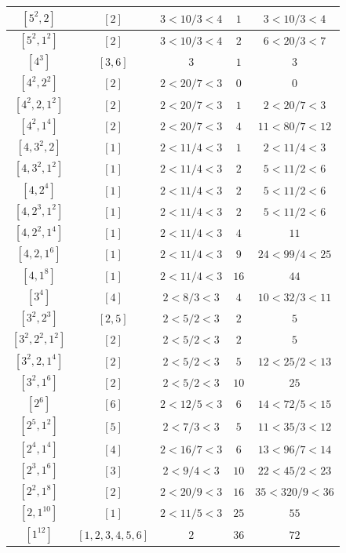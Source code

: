 \documentclass{article}%
\begin{document}
\begin{center}
\begin{longtable}{||c|c|c|c|c||}
$[5^{2}, 2]$ & $[2]$ & $3 < 10/3 < 4$ & $1$ & $3 < 10/3 < 4$ \\ \hline 
$[5^{2}, 1^{2}]$ & $[2]$ & $3 < 10/3 < 4$ & $2$ & $6 < 20/3 < 7$ \\ \hline 
$[4^{3}]$ & $[3, 6]$ & $3$ & $1$ & $3$ \\ \hline 
$[4^{2}, 2^{2}]$ & $[2]$ & $2 < 20/7 < 3$ & $0$ & $0$ \\ \hline 
$[4^{2}, 2, 1^{2}]$ & $[2]$ & $2 < 20/7 < 3$ & $1$ & $2 < 20/7 < 3$ \\ \hline 
$[4^{2}, 1^{4}]$ & $[2]$ & $2 < 20/7 < 3$ & $4$ & $11 < 80/7 < 12$ \\ \hline 
$[4, 3^{2}, 2]$ & $[1]$ & $2 < 11/4 < 3$ & $1$ & $2 < 11/4 < 3$ \\ \hline 
$[4, 3^{2}, 1^{2}]$ & $[1]$ & $2 < 11/4 < 3$ & $2$ & $5 < 11/2 < 6$ \\ \hline 
$[4, 2^{4}]$ & $[1]$ & $2 < 11/4 < 3$ & $2$ & $5 < 11/2 < 6$ \\ \hline 
$[4, 2^{3}, 1^{2}]$ & $[1]$ & $2 < 11/4 < 3$ & $2$ & $5 < 11/2 < 6$ \\ \hline 
$[4, 2^{2}, 1^{4}]$ & $[1]$ & $2 < 11/4 < 3$ & $4$ & $11$ \\ \hline 
$[4, 2, 1^{6}]$ & $[1]$ & $2 < 11/4 < 3$ & $9$ & $24 < 99/4 < 25$ \\ \hline 
$[4, 1^{8}]$ & $[1]$ & $2 < 11/4 < 3$ & $16$ & $44$ \\ \hline 
$[3^{4}]$ & $[4]$ & $2 < 8/3 < 3$ & $4$ & $10 < 32/3 < 11$ \\ \hline 
$[3^{2}, 2^{3}]$ & $[2, 5]$ & $2 < 5/2 < 3$ & $2$ & $5$ \\ \hline 
$[3^{2}, 2^{2}, 1^{2}]$ & $[2]$ & $2 < 5/2 < 3$ & $2$ & $5$ \\ \hline 
$[3^{2}, 2, 1^{4}]$ & $[2]$ & $2 < 5/2 < 3$ & $5$ & $12 < 25/2 < 13$ \\ \hline 
$[3^{2}, 1^{6}]$ & $[2]$ & $2 < 5/2 < 3$ & $10$ & $25$ \\ \hline 
$[2^{6}]$ & $[6]$ & $2 < 12/5 < 3$ & $6$ & $14 < 72/5 < 15$ \\ \hline 
$[2^{5}, 1^{2}]$ & $[5]$ & $2 < 7/3 < 3$ & $5$ & $11 < 35/3 < 12$ \\ \hline 
$[2^{4}, 1^{4}]$ & $[4]$ & $2 < 16/7 < 3$ & $6$ & $13 < 96/7 < 14$ \\ \hline 
$[2^{3}, 1^{6}]$ & $[3]$ & $2 < 9/4 < 3$ & $10$ & $22 < 45/2 < 23$ \\ \hline 
$[2^{2}, 1^{8}]$ & $[2]$ & $2 < 20/9 < 3$ & $16$ & $35 < 320/9 < 36$ \\ \hline 
$[2, 1^{10}]$ & $[1]$ & $2 < 11/5 < 3$ & $25$ & $55$ \\ \hline 
$[1^{12}]$ & $[1, 2, 3, 4, 5, 6]$ & $2$ & $36$ & $72$ \\ \hline 
    \end{longtable}
    \end{center}
\newpage
\end{document}
